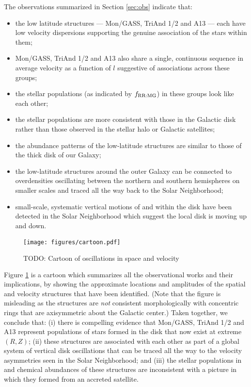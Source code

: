\documentclass[galaxies,article,submit,moreauthors,pdftex,10pt,a4paper]{mdpi}
\newcommand{\frrmg}{\ensuremath{f_{\rm RR:MG}}}
\begin{document}
The observations summarized in Section \ref{sec:obs} indicate that:
\begin{itemize}
\item the low latitude structures --- Mon/GASS, TriAnd 1/2 and A13  --- each have low velocity dispersions supporting the genuine association of the stars within them;
\item Mon/GASS, TriAnd 1/2 and A13 also share a single, continuous sequence in average velocity as a function of $l$ suggestive of associations across these groups;
\item the stellar populations (as indicated by \frrmg) in these groups look like each other;
\item the stellar populations are more consistent with those in the Galactic disk rather than those observed in the stellar halo or Galactic  satellites;
\item the abundance patterns  of the low-latitude structures are similar to those of the thick disk of our Galaxy;
\item the low-latitude structures around the outer Galaxy can be connected to overdensities oscillating between the northern and southern hemispheres on smaller scales and traced all the way back to the Solar Neighborhood;
\item small-scale, systematic vertical motions of and within the disk have been detected in the Solar Neighborhood which suggest the local disk is moving up and down.
\end{itemize}

\begin{figure}[t]
\centering
\texttt{[image: figures/cartoon.pdf]}
\caption{\label{fig:cartoon}
TODO: Cartoon of oscillations in space and velocity}
\end{figure}

Figure \ref{fig:cartoon} is a cartoon which summarizes all the observational works and their implications, by showing the approximate locations and amplitudes of the spatial and velocity structures that have been identified. (Note that the figure is misleading as the structures are {\it not} consistent morphologically with concentric rings that are axisymmetric about the Galactic center.)
Taken together, we conclude that: (i) there is compelling evidence that Mon/GASS, TriAnd 1/2 and A13 represent populations of stars formed in the disk that now exist at extreme $(R,Z)$;
(ii) these structures are associated with each other as part of a global system of vertical disk oscillations that can be traced all the way to the velocity asymmetries seen in the Solar Neighborhood; and
(iii) the stellar populations in and chemical abundances of these structures are inconsistent with a picture in which they formed from an accreted satellite.
\end{document}
